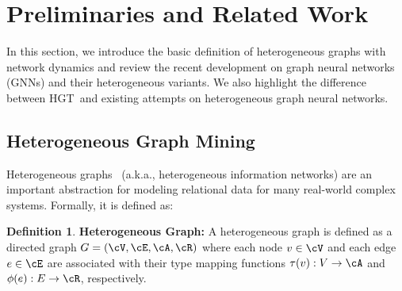 \documentclass[sigconf]{acmart}
\theoremstyle{definition}
\newtheorem{defn}[theorem]{Definition}
\newcommand{\short}{HGT}
\begin{document}
\begin{comment}
For graph heterogeneity, We use the meta relation triplet of graph schema to define interaction and transform matrices, so that the model can capture both the common and specific patterns of different relationships using equal or even smaller parameters. In this way, the nodes in different types are allowed to maintain in their specific representation distribution, while connected nodes in different types can still interact and transform messages without being restricted by distribution gap.


For the graph dynamic without losing structure information, we first define a dynamic timestamp schema, under which the graph reserves all the edges happening in different times. Then we propose a relative temporal encoding to incorporate temporal information into HGT using limited computational resources. By end-to-end training, the model can automatically learn the temporal dependency and differences, 



In addition to the model architecture, training GNN for large-scale graph is also a significant challenge. The vanilla GCN has to calculate all the node representation in the graph, which is infeasible for web-scale graph data. To alleviate with it, researchers have proposed different sampling methods to conduct mini-batch training~\cite{graphsage,fastgcn,DBLP:conf/icml/ChenZS18,ladies}. However, all these sampling methods are designed for homogeneous graphs, and there has not been any work to conduct large-scale training for heterogeneous graphs. We therefore design a heterogeneous layer-dependent sub-graph sampling algorithm, with which the model can train on arbitrary large graphs and can achieve good performance. 






\end{comment} 
\section{Preliminaries and Related Work}\label{sec:problem} 
In this section, we introduce the basic definition of heterogeneous graphs with network dynamics and review the recent development on graph neural networks (GNNs) and their heterogeneous variants. 
We also highlight the difference between \short \ and existing attempts on heterogeneous graph neural networks.


\subsection{Heterogeneous Graph Mining}
Heterogeneous graphs~\cite{Sun:BOOK2012} (a.k.a., heterogeneous information networks) are an important abstraction for modeling relational data for many real-world complex systems. Formally, it is defined as:
\theoremstyle{definition}
\begin{defn}{\textbf{Heterogeneous Graph:}}
A heterogeneous graph is defined as a directed graph $G = (\cV, \cE, \cA, \cR)$ where each node $v \in \cV$ and each edge $e \in \cE$ are associated with their type mapping functions $\tau(v): V \rightarrow \cA$ and $\phi(e): E \rightarrow \cR$, respectively. 
\end{defn}
\end{document}
